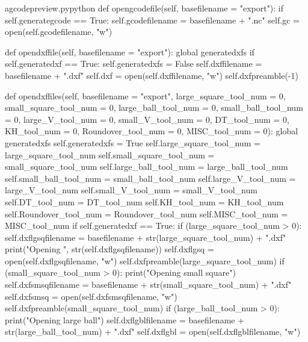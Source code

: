 \documentclass{ltxdoc}
\begin{document}
\lstset{firstnumber=\thegcpy}
\begin{writecode}{a}{gcodepreview.py}{python}
    def opengcodefile(self, basefilename = "export"):
        if self.generategcode == True:
            self.gcodefilename = basefilename + ".nc"
            self.gc = open(self.gcodefilename, "w")

    def opendxffile(self, basefilename = "export"): 
        global generatedxfs
        if self.generatedxf == True:
            self.generatedxfs = False
            self.dxffilename = basefilename + ".dxf"
            self.dxf = open(self.dxffilename, "w")
            self.dxfpreamble(-1)

    def opendxffiles(self, basefilename = "export", 
                     large_square_tool_num = 0, 
                     small_square_tool_num = 0, 
                     large_ball_tool_num = 0,
                     small_ball_tool_num = 0,
                     large_V_tool_num = 0,
                     small_V_tool_num = 0,
                     DT_tool_num = 0,
                     KH_tool_num = 0,
                     Roundover_tool_num = 0,
                     MISC_tool_num = 0):
        global generatedxfs
        self.generatedxfs = True
        self.large_square_tool_num = large_square_tool_num 
        self.small_square_tool_num = small_square_tool_num
        self.large_ball_tool_num = large_ball_tool_num
        self.small_ball_tool_num = small_ball_tool_num
        self.large_V_tool_num = large_V_tool_num
        self.small_V_tool_num = small_V_tool_num
        self.DT_tool_num = DT_tool_num
        self.KH_tool_num = KH_tool_num
        self.Roundover_tool_num = Roundover_tool_num
        self.MISC_tool_num = MISC_tool_num
        if self.generatedxf == True:
            if (large_square_tool_num > 0):
                self.dxflgsqfilename = basefilename + str(large_square_tool_num) + ".dxf"
                print("Opening ", str(self.dxflgsqfilename))
                self.dxflgsq = open(self.dxflgsqfilename, "w")
                self.dxfpreamble(large_square_tool_num)
            if (small_square_tool_num > 0):
                print("Opening small square")
                self.dxfsmsqfilename = basefilename + str(small_square_tool_num) + ".dxf"
                self.dxfsmsq = open(self.dxfsmsqfilename, "w")
                self.dxfpreamble(small_square_tool_num)
            if (large_ball_tool_num > 0):
                print("Opening large ball")
                self.dxflgblfilename = basefilename + str(large_ball_tool_num) + ".dxf"
                self.dxflgbl = open(self.dxflgblfilename, "w")

\end{writecode}
\end{document}
